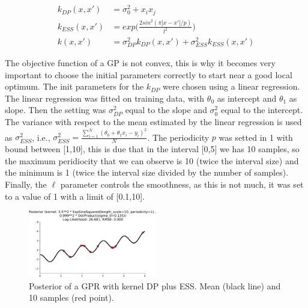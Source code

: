 \documentclass{article}
\begin{document}
\begin{align}
k_{DP}(x,x') &= \sigma_{0}^{2}+x_{i}x_{j}\\
k_{ESS}(x,x') &= exp\bigg(\frac{2sin^{2}(\pi |x-x'|/p)}{l^{2}}\bigg)\\
k(x,x') &= \sigma_{DP}^{2}k_{DP}(x,x')+\sigma_{ESS}^{2}k_{ESS}(x,x')
\end{align}

The objective function of a GP is not convex, this is why it becomes very important to choose the initial parameters correctly to start near a good local optimum. The init parameters for the $k_{DP}$  were chosen using a linear regression. The linear regression was fitted on training data, with $\theta_{0}$ as intercept and $\theta_{1}$ as slope. Then the setting was $\sigma_{DP}^{2}$ equal to the slope and $\sigma_{0}^{2}$ equal to the intercept. The variance with respect to the mean estimated by the linear regression is used as $\sigma_{ESS}^{2}$, i.e., $\sigma_{ESS}^{2}=\frac{\sum_{i=1}^{N}(\theta_{0}+\theta_{1}x_{i}-y_{i})^{2}}{N}$. The periodicity $p$ was setted in 1 with bound between [1,10], this is due that in the interval [0,5] we has 10 samples, so the maximum peridiocity that we can observe is 10 (twice the interval size) and the minimum is 1 (twice the interval size divided by the number of samples). Finally, the $\ell$ parameter controls the smoothness, as this is not much, it was set to a value of 1 with a limit of [0.1,10].

\begin{figure}[h]
    \includegraphics[width=0.5\textwidth]{img/gp3.pdf}
    \caption{Posterior of a GPR with kernel DP plus ESS. Mean (black line) and 10 samples (red point).}
\end{figure}
\end{document}
